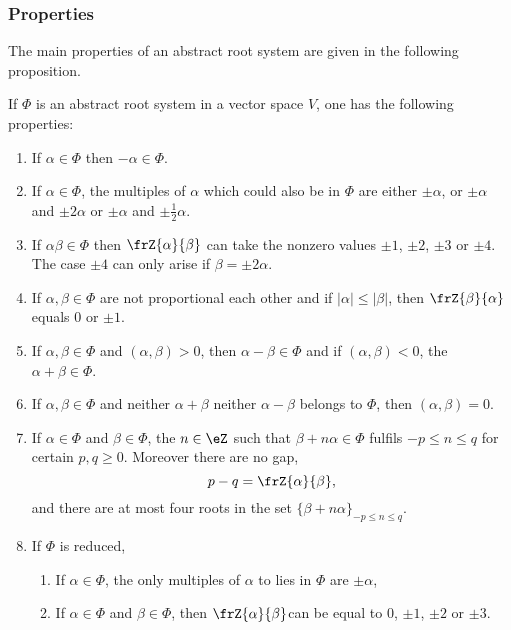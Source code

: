 \subsubsection{Properties}

The main properties of an abstract root system are given in the  following proposition.
\begin{proposition}     \label{PropPropAbstrRootviiiikl}
If $\Phi$ is an abstract root system in a vector space $V$, one has the following properties:

\begin{enumerate}
\item\label{enubi} If $\alpha\in\Phi$ then $-\alpha\in\Phi$.

\item\label{enubii} If $\alpha\in\Phi$, the multiples of $\alpha$ which could also be in $\Phi$ are either $\pm\alpha$, or $\pm\alpha$ and $\pm 2\alpha$ or $\pm\alpha$ and $\pm\frac{1}{2}\alpha$.

\item\label{enubiii} If $\alpha\beta\in\Phi$ then $\frZ{\alpha}{\beta}$ can take the nonzero values $\pm 1$, $\pm 2$, $\pm 3$ or $\pm 4$. The case $\pm 4$ can only arise if $\beta=\pm 2\alpha$.

\item\label{enubiv} If $\alpha,\beta\in\Phi$ are not proportional each other and if $|\alpha|\leq|\beta|$, then $\frZ{\beta}{\alpha}$ equals $0$ or $\pm 1$.

\item\label{enubv} If $\alpha,\beta\in\Phi$ and $(\alpha,\beta)>0$, then $\alpha-\beta\in\Phi$ and if $(\alpha,\beta)<0$, the $\alpha+\beta\in\Phi$.

\item\label{enubvi} If $\alpha,\beta\in\Phi$ and neither $\alpha+\beta$ neither $\alpha-\beta$ belongs to $\Phi$, then $(\alpha,\beta)=0$.

\item\label{enubvii} If $\alpha\in\Phi$ and $\beta\in\Phi$, the $n\in\eZ$ such that $\beta+n\alpha\in\Phi$ fulfils $-p\leq n\leq q$ for certain $p,q\geq 0$. Moreover there are no gap,
\[
   p-q=\frZ{\alpha}{\beta},
\]
and there are at most four roots in the set $\{\beta+n\alpha\}_{-p\leq n\leq q}$.

\item\label{enubviii} If $\Phi$ is reduced, 

\begin{enumerate}
\item\label{enubviiia} If $\alpha\in\Phi$, the only multiples of $\alpha$ to lies in $\Phi$ are $\pm\alpha$,
\item\label{enubviiib} If $\alpha\in\Phi$ and $\beta\in\Phi$, then $\frZ{\alpha}{\beta}$can be equal to $0$, $\pm 1$, $\pm 2$ or $\pm 3$.
\end{enumerate}
\end{enumerate} \label{prop:Cartan_matr}
\end{proposition}
